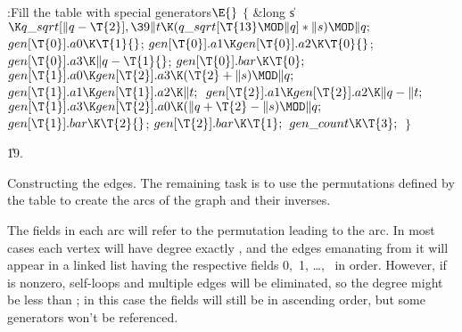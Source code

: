 \Y\B\4:Fill the  table with special generators\X${}\E{}$\6
${}\{{}$\5
\1\&{long} \|s${}\K\\{q\_sqrt}[\|q-\T{2}],\39\|t\K(\\{q\_sqrt}[\T{13}\MOD\|q]*%
\|s)\MOD\|q;{}$\7
${}\\{gen}[\T{0}].\\{a0}\K\T{1}{}$;\5
${}\\{gen}[\T{0}].\\{a1}\K\\{gen}[\T{0}].\\{a2}\K\T{0}{}$;\5
${}\\{gen}[\T{0}].\\{a3}\K\|q-\T{1}{}$;\5
${}\\{gen}[\T{0}].\\{bar}\K\T{0};{}$\6
${}\\{gen}[\T{1}].\\{a0}\K\\{gen}[\T{2}].\\{a3}\K(\T{2}+\|s)\MOD\|q;{}$\6
${}\\{gen}[\T{1}].\\{a1}\K\\{gen}[\T{1}].\\{a2}\K\|t;{}$\6
${}\\{gen}[\T{2}].\\{a1}\K\\{gen}[\T{2}].\\{a2}\K\|q-\|t;{}$\6
${}\\{gen}[\T{1}].\\{a3}\K\\{gen}[\T{2}].\\{a0}\K(\|q+\T{2}-\|s)\MOD\|q;{}$\6
${}\\{gen}[\T{1}].\\{bar}\K\T{2}{}$;\5
${}\\{gen}[\T{2}].\\{bar}\K\T{1};{}$\6
${}\\{gen\_count}\K\T{3};{}$\6
\4${}\}{}$\2\par
\U19.\fi

Constructing the edges. The remaining task is to use the permutations
defined by the  table to create the arcs of the graph and
their inverses.

The  fields in each arc will refer to the permutation leading to
the
arc. In most cases each vertex  will have degree exactly , and the
edges emanating from it will appear in a linked list having
the respective  fields 0,~1, \dots,~ in order. However,
if  is nonzero, self-loops and multiple edges will be
eliminated,
so the degree might be less than ; in this case the  fields
will still be in ascending order, but some generators won't be referenced.

